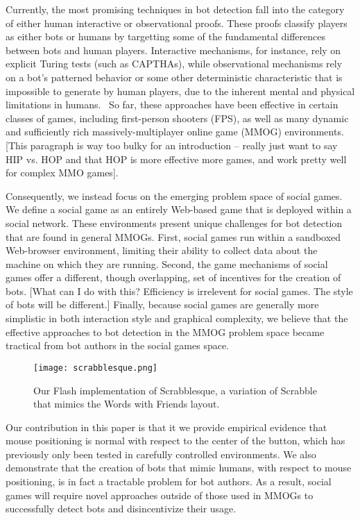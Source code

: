 \documentclass{acm_proc_article-sp}
\begin{document}
Currently, the most promising techniques in bot detection fall into the category of either human interactive or observational proofs. These proofs classify players as either bots or humans by targetting some of the fundamental differences between bots and human players. Interactive mechanisms, for instance, rely on explicit Turing tests (such as CAPTHAs), while observational mechanisms rely on a bot's patterned behavior or some other deterministic characteristic that is impossible to generate by human players, due to the inherent mental and physical limitations in humans.~\cite{preventbotitem} So far, these approaches have been effective in certain classes of games, including first-person shooters (FPS), as well as many dynamic and sufficiently rich massively-multiplayer online game (MMOG) environments. [This paragraph is way too bulky for an introduction -- really just want to say HIP vs. HOP and that HOP is more effective more games, and work pretty well for complex MMO games].

Consequently, we instead focus on the emerging problem space of social games. We define a social game as an entirely Web-based game that is deployed within a social network. These environments present unique challenges for bot detection that are found in general MMOGs. First, social games run within a sandboxed Web-browser environment, limiting their ability to collect data about the machine on which they are running. Second, the game mechanisms of social games offer a different, though overlapping, set of incentives for the creation of bots. [What can I do with this? Efficiency is irrelevent for social games. The style of bots will be different.] Finally, because social games are generally more simplistic in both interaction style and graphical complexity, we believe that the effective approaches to bot detection in the MMOG problem space became tractical from bot authors in the social games space.


\begin{figure}
\centering
\texttt{[image: scrabblesque.png]}
\caption{Our Flash implementation of Scrabblesque, a variation of Scrabble that mimics the Words with Friends layout.}
\end{figure}

Our contribution in this paper is that it we provide empirical evidence that mouse positioning is normal with respect to the center of the button, which has previously only been tested in carefully controlled environments. We also demonstrate that the creation of bots that mimic humans, with respect to mouse positioning, is in fact a tractable problem for bot authors. As a result, social games will require novel approaches outside of those used in MMOGs to successfully detect bots and disincentivize their usage.
\end{document}
